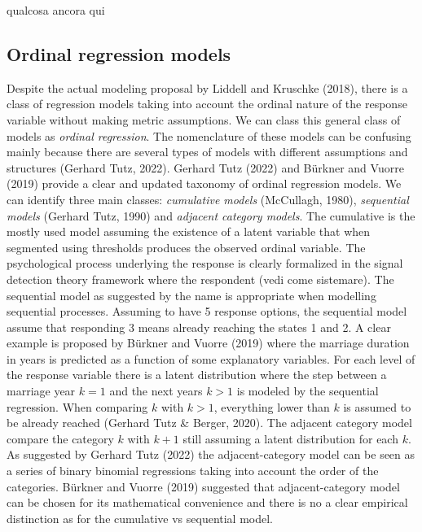 \documentclass[
  man,floatsintext]{apa6}
\begin{document}
qualcosa ancora qui

\subsection{Ordinal regression models}\label{ordinal-regression-models}

Despite the actual modeling proposal by Liddell and Kruschke (2018), there is a class of regression models taking into account the ordinal nature of the response variable without making metric assumptions. We can class this general class of models as \emph{ordinal regression}. The nomenclature of these models can be confusing mainly because there are several types of models with different assumptions and structures (Gerhard Tutz, 2022). Gerhard Tutz (2022) and Bürkner and Vuorre (2019) provide a clear and updated taxonomy of ordinal regression models. We can identify three main classes: \emph{cumulative models} (McCullagh, 1980), \emph{sequential models} (Gerhard Tutz, 1990) and \emph{adjacent category models}. The cumulative is the mostly used model assuming the existence of a latent variable that when segmented using thresholds produces the observed ordinal variable. The psychological process underlying the response is clearly formalized in the signal detection theory framework where the respondent (vedi come sistemare). The sequential model as suggested by the name is appropriate when modelling sequential processes. Assuming to have 5 response options, the sequential model assume that responding 3 means already reaching the states 1 and 2. A clear example is proposed by Bürkner and Vuorre (2019) where the marriage duration in years is predicted as a function of some explanatory variables. For each level of the response variable there is a latent distribution where the step between a marriage year \(k = 1\) and the next years \(k > 1\) is modeled by the sequential regression. When comparing \(k\) with \(k > 1\), everything lower than \(k\) is assumed to be already reached (Gerhard Tutz \& Berger, 2020). The adjacent category model compare the category \(k\) with \(k + 1\) still assuming a latent distribution for each \(k\). As suggested by Gerhard Tutz (2022) the adjacent-category model can be seen as a series of binary binomial regressions taking into account the order of the categories. Bürkner and Vuorre (2019) suggested that adjacent-category model can be chosen for its mathematical convenience and there is no a clear empirical distinction as for the cumulative vs sequential model.
\end{document}
